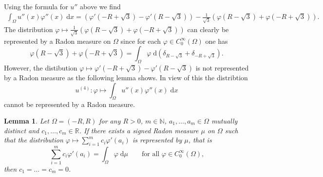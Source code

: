 \documentclass[twoside,11pt]{article}
\newtheorem{lemma}{Lemma}
\theoremstyle{definition}
\begin{document}
Using the formula for $u''$ above we find 
\begin{align*}
    \int_\Omega u''(x) \varphi''(x) \; \mathrm{d}x  = (\varphi'(-R+\sqrt{3}) - \varphi'(R- \sqrt{3}) ) - \frac{1}{\sqrt{3}} (\varphi(R-\sqrt{3}) + \varphi(-R+\sqrt{3})).  
\end{align*}
The distribution $ \varphi \mapsto \frac{1}{\sqrt{3}} (\varphi(R-\sqrt{3}) + \varphi(-R+\sqrt{3}))$ can clearly be represented by a Radon measure on $\Omega$ since for each $\varphi \in C_0^\infty(\Omega)$ one has
\begin{equation*}
    \varphi(R-\sqrt{3}) + \varphi(-R+\sqrt{3}) = \int_\Omega \varphi \; \mathrm{d}(\delta_{R-\sqrt{3}} + \delta_{-R+\sqrt{3}}).
\end{equation*}
However, the distibution $\varphi \mapsto \varphi'(-R+\sqrt{3}) - \varphi'(R- \sqrt{3})$ is not represented by a Radon measure as the following lemma shows. In view of this the distribtion
\begin{equation*}
    u^{(4)} : \varphi \mapsto \int_\Omega u''(x) \varphi''(x) \; \mathrm{d}x
\end{equation*}
cannot be represented by a Radon measure. 
\begin{lemma}
    Let $\Omega = (-R,R)$ for any $R> 0$, $m \in \mathbb{N}$, $a_1,\ldots,a_m \in \Omega$ mutually distinct %
    and $c_1,\ldots,c_m \in \mathbb{R}$. If there exists a signed Radon measure $\mu$ on $\Omega$ such that the distribution $\varphi \mapsto \sum_{i = 1}^m c_i \varphi'(a_i)$ is represented by $\mu$, that is
    \begin{equation}\label{eq:Ableitungalsmass}
        \sum_{i = 1}^m c_i \varphi'(a_i) = \int_\Omega \varphi \; \mathrm{d}\mu \qquad \textrm{for all $\varphi \in C_0^\infty(\Omega)$,}
    \end{equation}
    then $c_1=...=c_m = 0$. 
\end{lemma}
\end{document}
